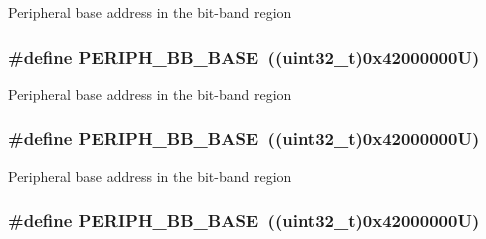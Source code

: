 Peripheral base address in the bit-\/band region \hypertarget{group___peripheral__memory__map_gaed7efc100877000845c236ccdc9e144a}{
\subsubsection[{P\-E\-R\-I\-P\-H\-\_\-\-B\-B\-\_\-\-B\-A\-S\-E}]{\setlength{\rightskip}{0pt plus 5cm}\#define P\-E\-R\-I\-P\-H\-\_\-\-B\-B\-\_\-\-B\-A\-S\-E~((uint32\-\_\-t)0x42000000\-U)}}\label{group___peripheral__memory__map_gaed7efc100877000845c236ccdc9e144a}
Peripheral base address in the bit-\/band region \hypertarget{group___peripheral__memory__map_gaed7efc100877000845c236ccdc9e144a}{
\subsubsection[{P\-E\-R\-I\-P\-H\-\_\-\-B\-B\-\_\-\-B\-A\-S\-E}]{\setlength{\rightskip}{0pt plus 5cm}\#define P\-E\-R\-I\-P\-H\-\_\-\-B\-B\-\_\-\-B\-A\-S\-E~((uint32\-\_\-t)0x42000000\-U)}}\label{group___peripheral__memory__map_gaed7efc100877000845c236ccdc9e144a}
Peripheral base address in the bit-\/band region \hypertarget{group___peripheral__memory__map_gaed7efc100877000845c236ccdc9e144a}{
\subsubsection[{P\-E\-R\-I\-P\-H\-\_\-\-B\-B\-\_\-\-B\-A\-S\-E}]{\setlength{\rightskip}{0pt plus 5cm}\#define P\-E\-R\-I\-P\-H\-\_\-\-B\-B\-\_\-\-B\-A\-S\-E~((uint32\-\_\-t)0x42000000\-U)}}\label{group___peripheral__memory__map_gaed7efc100877000845c236ccdc9e144a}
